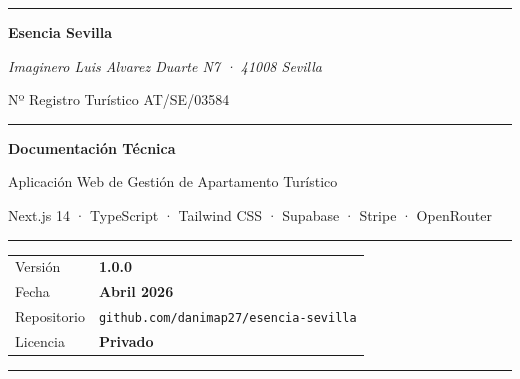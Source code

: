 \documentclass[12pt,a4paper,twoside,openright]{report}
\begin{document}

\frontmatter

\begin{titlepage}
\pagecolor{Crema}
\afterpage{\nopagecolor}
\centering
\vspace*{1.5cm}

{\color{Terracota}\rule{\textwidth}{4pt}}
\vspace{1.5cm}

{\fontsize{42}{52}\selectfont\bfseries\color{Tinta}Esencia Sevilla}

\vspace{0.6cm}
{\Large\color{Terracota}\itshape Imaginero Luis Alvarez Duarte N7 · 41008 Sevilla}

\vspace{0.3cm}
{\normalsize\color{Tinta!60} Nº Registro Turístico AT/SE/03584}

\vspace{1.5cm}
{\color{GrisMedio}\rule{\textwidth}{0.5pt}}
\vspace{1cm}

{\fontsize{28}{36}\selectfont\bfseries\color{Azulejo}Documentación Técnica}

\vspace{0.5cm}
{\large\color{Tinta!80} Aplicación Web de Gestión de Apartamento Turístico}

\vspace{0.4cm}
{\normalsize\color{Tinta!60}
Next.js 14 · TypeScript · Tailwind CSS · Supabase · Stripe · OpenRouter
}

\vspace{1.5cm}
{\color{GrisMedio}\rule{0.6\textwidth}{0.5pt}}
\vspace{1cm}

\begin{tabular}{@{}ll@{}}
  \textcolor{Tinta!50}{\small Versión} & \textbf{1.0.0} \\[6pt]
  \textcolor{Tinta!50}{\small Fecha} & \textbf{Abril 2026} \\[6pt]
  \textcolor{Tinta!50}{\small Repositorio} & \texttt{\small github.com/danimap27/esencia-sevilla} \\[6pt]
  \textcolor{Tinta!50}{\small Licencia} & \textbf{Privado} \\
\end{tabular}

\vfill
{\color{Terracota}\rule{\textwidth}{4pt}}
\end{titlepage}
\end{document}
